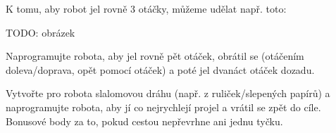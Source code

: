 \documentclass[../main.tex]{subfiles}
\begin{document}
	K tomu, aby robot jel rovně 3 otáčky, můžeme udělat např. toto:

	TODO: obrázek

	\begin{question}
		Naprogramujte robota, aby jel rovně pět otáček, obrátil se (otáčením doleva/doprava, opět pomocí otáček) a poté jel dvanáct otáček dozadu.
	\end{question}

	\begin{question*}
		Vytvořte pro robota slalomovou dráhu (např. z ruliček/slepených papírů) a naprogramujte robota, aby jí co nejrychlejí projel a vrátil se zpět do cíle. Bonusové body za to, pokud cestou nepřevrhne ani jednu tyčku.
	\end{question*}
\end{document}
